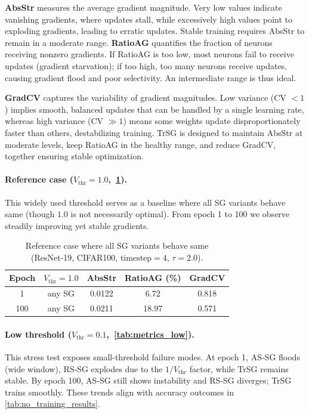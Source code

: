 \textbf{AbsStr} measures the average gradient magnitude. Very low values indicate vanishing gradients, where updates stall, 
while excessively high values point to exploding gradients, leading to erratic updates. 
Stable training requires AbsStr to remain in a moderate range. 
\textbf{RatioAG} quantifies the fraction of neurons receiving nonzero gradients. 
If RatioAG is too low, most neurons fail to receive updates (gradient starvation); 
if too high, too many neurons receive updates, causing gradient flood and poor selectivity. 
An intermediate range is thus ideal. 

\textbf{GradCV} captures the variability of gradient magnitudes. 
Low variance (CV $<1$) implies smooth, balanced updates that can be handled by a single learning rate, 
whereas high variance (CV $\gg 1$) means some weights update disproportionately faster than others, destabilizing training.  
TrSG is designed to maintain AbsStr at moderate levels, keep RatioAG in the healthy range, 
and reduce GradCV, together ensuring stable optimization.

\paragraph{Reference case ($V_{\text{thr}}{=}1.0$,~\cref{tab:metrics_ref}).}
This widely used threshold serves as a baseline where all SG variants behave same (though $1.0$ is not necessarily optimal). From epoch 1 to 100 we observe steadily improving yet stable gradients.

\begin{table}[t]
\centering
\small
\begin{tabular}{ccccc}
\toprule
\textbf{Epoch} & \textbf{$V_{\text{thr}}{=}1.0$} & \textbf{AbsStr} & \textbf{RatioAG (\%)} & \textbf{GradCV} \\
\midrule
1   & any SG & 0.0122 & 6.72  & 0.818 \\
100 & any SG & 0.0211 & 18.97 & 0.571 \\
\bottomrule
\end{tabular}
\caption{Reference case where all SG variants behave same (ResNet‑19, CIFAR100, $\text{timestep}{=}4$, $\tau{=}2.0$).}
\label{tab:metrics_ref}
\end{table}

\paragraph{Low threshold ($V_{\text{thr}}{=}0.1$,~\cref{tab:metrics_low}).}
This stress test exposes small-threshold failure modes. At epoch 1, AS‑SG floods (wide window), RS‑SG explodes due to the $1/V_{\text{thr}}$ factor, while TrSG remains stable. By epoch 100, AS‑SG still shows instability and RS‑SG diverges; TrSG trains smoothly. These trends align with accuracy outcomes in \cref{tab:no_training_results}.

